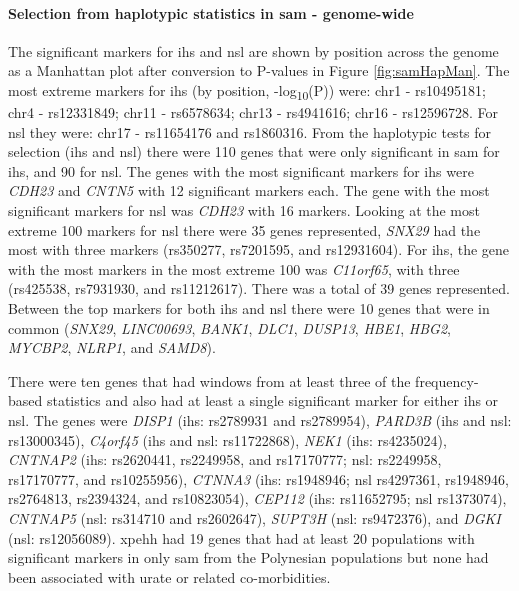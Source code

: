 \documentclass[twoside,openright]{report}
\let\oldparagraph\paragraph
\renewcommand{\paragraph}[1]{\oldparagraph{#1}\mbox{}}
\begin{document}
\paragraph{\texorpdfstring{Selection from haplotypic statistics in
\gls{sam} -
genome-wide}{Selection from haplotypic statistics in  - genome-wide}}\label{selection-from-haplotypic-statistics-in---genome-wide-1}

The significant markers for \gls{ihs} and \gls{nsl} are shown by
position across the genome as a Manhattan plot after conversion to
P-values in Figure \ref{fig:samHapMan}. The most extreme markers for
\gls{ihs} (by position, -log\textsubscript{10}(P)) were: chr1 -
rs10495181; chr4 - rs12331849; chr11 - rs6578634; chr13 - rs4941616;
chr16 - rs12596728. For \gls{nsl} they were: chr17 - rs11654176 and
rs1860316. From the haplotypic tests for selection (\gls{ihs} and
\gls{nsl}) there were 110 genes that were only significant in \gls{sam}
for \gls{ihs}, and 90 for \gls{nsl}. The genes with the most significant
markers for \gls{ihs} were \emph{CDH23} and \emph{CNTN5} with 12
significant markers each. The gene with the most significant markers for
\gls{nsl} was \emph{CDH23} with 16 markers. Looking at the most extreme
100 markers for \gls{nsl} there were 35 genes represented, \emph{SNX29}
had the most with three markers (rs350277, rs7201595, and rs12931604).
For \gls{ihs}, the gene with the most markers in the most extreme 100
was \emph{C11orf65}, with three (rs425538, rs7931930, and rs11212617).
There was a total of 39 genes represented. Between the top markers for
both \gls{ihs} and \gls{nsl} there were 10 genes that were in common
(\emph{SNX29}, \emph{LINC00693}, \emph{BANK1}, \emph{DLC1},
\emph{DUSP13}, \emph{HBE1}, \emph{HBG2}, \emph{MYCBP2}, \emph{NLRP1},
and \emph{SAMD8}).

There were ten genes that had windows from at least three of the
frequency-based statistics and also had at least a single significant
marker for either \gls{ihs} or \gls{nsl}. The genes were \emph{DISP1}
(\gls{ihs}: rs2789931 and rs2789954), \emph{PARD3B} (\gls{ihs} and
\gls{nsl}: rs13000345), \emph{C4orf45} (\gls{ihs} and \gls{nsl}:
rs11722868), \emph{NEK1} (\gls{ihs}: rs4235024), \emph{CNTNAP2}
(\gls{ihs}: rs2620441, rs2249958, and rs17170777; \gls{nsl}: rs2249958,
rs17170777, and rs10255956), \emph{CTNNA3} (\gls{ihs}: rs1948946;
\gls{nsl} rs4297361, rs1948946, rs2764813, rs2394324, and rs10823054),
\emph{CEP112} (\gls{ihs}: rs11652795; \gls{nsl} rs1373074),
\emph{CNTNAP5} (\gls{nsl}: rs314710 and rs2602647), \emph{SUPT3H}
(\gls{nsl}: rs9472376), and \emph{DGKI} (\gls{nsl}: rs12056089).
\Gls{xpehh} had 19 genes that had at least 20 populations with
significant markers in only \gls{sam} from the Polynesian populations
but none had been associated with urate or related co-morbidities.
\end{document}
